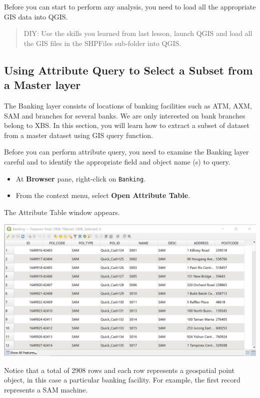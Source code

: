 \documentclass[
  letterpaper,
  DIV=11,
  numbers=noendperiod]{scrreprt}
\providecommand{\tightlist}{%
  \setlength{\itemsep}{0pt}\setlength{\parskip}{0pt}}\usepackage{longtable,booktabs,array}
\begin{document}
Before you can start to perform any analysis, you need to load all the
appropriate GIS data into QGIS.

\begin{quote}
DIY: Use the skills you learned from last lesson, launch QGIS and load
all the GIS files in the SHPFiles sub-folder into QGIS.
\end{quote}

\hypertarget{using-attribute-query-to-select-a-subset-from-a-master-layer}{%
\subsection{Using Attribute Query to Select a Subset from a Master
layer}\label{using-attribute-query-to-select-a-subset-from-a-master-layer}}

The Banking layer consists of locations of banking facilities such as
ATM, AXM, SAM and branches for several banks. We are only interested on
bank branches belong to XBS. In this section, you will learn how to
extract a subset of dataset from a master dataset using GIS query
function.

Before you can perform attribute query, you need to examine the Banking
layer careful and to identify the appropriate field and object name (s)
to query.

\begin{itemize}
\tightlist
\item
  At \textbf{Browser} pane, right-click on \texttt{Banking}.
\item
  From the context menu, select \textbf{Open Attribute Table}.
\end{itemize}

The Attribute Table window appears.

\includegraphics{./img05/image1.jpg}

Notice that a total of 2908 rows and each row represents a geospatial
point object, in this case a particular banking facility. For example,
the first record represents a SAM machine.
\end{document}
